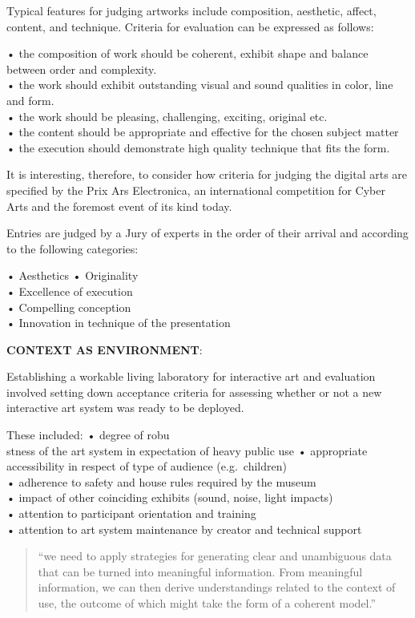 Typical features for judging artworks include composition, aesthetic, affect, content, and technique. Criteria for evaluation can be expressed as follows:

•	the composition of work should be coherent, exhibit shape and balance between order and complexity.\\
•	the work should exhibit outstanding visual and sound qualities in color, line and form.\\
•	the work should be pleasing, challenging, exciting, original etc.\\
•	the content should be appropriate and effective for the chosen subject matter\\
•	the execution should demonstrate high quality technique that fits the form.

It is interesting, therefore, to consider how criteria for judging the digital arts are specified by the Prix Ars Electronica, an international competition for Cyber Arts and the foremost event of its kind today.

Entries are judged by a Jury of experts in the order of their arrival and according to the following categories:

•	Aesthetics • Originality\\
•	Excellence of execution\\
•	Compelling conception\\
•	Innovation in technique of the presentation

\textbf{CONTEXT AS ENVIRONMENT}: \autocite[p.21]{Candy2012}

Establishing a workable living laboratory for interactive art and evaluation involved setting down acceptance criteria for assessing whether or not a new interactive art system was ready to be deployed.

These included:
•	degree of robu\\stness of the art system in expectation of heavy public use
•	appropriate accessibility in respect of type of audience (e.g.\ children)\\
•	adherence to safety and house rules required by the museum\\
•	impact of other coinciding exhibits (sound, noise, light impacts)\\
•	attention to participant orientation and training\\
•	attention to art system maintenance by creator and technical support

\begin{quote}
  ``we need to apply strategies for generating clear and unambiguous data that can be turned into meaningful information. From meaningful information, we can then derive understandings related to the context of use, the outcome of which might take the form of a coherent model.'' \autocite[p.21]{Candy2012}
\end{quote}

